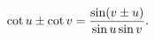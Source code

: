 \[\mathop{\cot\/}\nolimits u\pm\mathop{\cot\/}\nolimits v=\frac{\mathop{\sin\/}%
\nolimits\!\left(v\pm u\right)}{\mathop{\sin\/}\nolimits u\mathop{\sin\/}%
\nolimits v}.\]